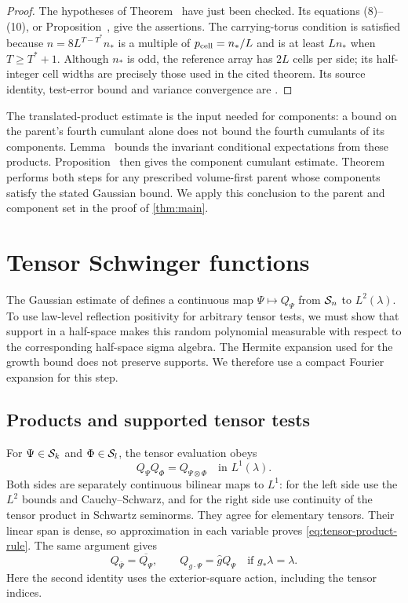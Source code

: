 \begin{proof}
The hypotheses of Theorem~
have just been checked. Its equations (8)--(10), or
Proposition~, give the assertions.
The carrying-torus condition is satisfied because
$n=8L^{T-T^*}n_*$ is a multiple of $p_{\rm cell}=n_*/L$
and is at least $Ln_*$ when $T\ge T^*+1$.
Although $n_*$ is odd, the reference array has $2L$ cells
per side; its half-integer cell widths are precisely those
used in the cited theorem. Its source identity, test-error
bound and variance convergence are \cite[Section~2.2, (19)--(20)]{VolumeTransfer}.
\end{proof}

The translated-product estimate is the input needed for
components: a bound on the parent's fourth cumulant alone
does not bound the fourth cumulants of its components.
Lemma~ bounds the invariant
conditional expectations from these products.
Proposition~ then gives the
component cumulant estimate. Theorem~
performs both steps for any prescribed volume-first parent
whose components satisfy the stated Gaussian bound.
We apply this conclusion to the parent and component set
in the proof of \cref{thm:main}.
\section{Tensor Schwinger functions}\label{sec:tensor-axioms}

The Gaussian estimate of \cite[Proposition~6.1]{ContinuumLimits} defines a continuous map
$\Psi\mapsto Q_\Psi$ from $\mathcal S_n$ to $L^2(\lambda)$.
To use law-level reflection positivity for arbitrary tensor tests,
we must show that support in a half-space makes this random polynomial
measurable with respect to the corresponding half-space sigma algebra. The Hermite
expansion used for the growth bound does not preserve supports.
We therefore use a compact Fourier expansion for this step.

\subsection{Products and supported tensor tests}

For $\Psi\in\mathcal S_k$ and $\Phi\in\mathcal S_l$, the tensor evaluation
obeys
\begin{equation}\label{eq:tensor-product-rule}
 Q_\Psi Q_\Phi=Q_{\Psi\otimes\Phi}\quad\text{in }L^1(\lambda).
\end{equation}
Both sides are separately continuous bilinear maps to $L^1$:
for the left side use the $L^2$ bounds and Cauchy--Schwarz, and for
the right side use continuity of the tensor product in Schwartz
seminorms. They agree for elementary tensors. Their linear span
is dense, so approximation in each variable proves
\eqref{eq:tensor-product-rule}. The same argument gives
\begin{equation}\label{eq:tensor-equivariance}
 Q_{\overline\Psi}=\overline{Q_\Psi},\qquad
 Q_{g\cdot\Psi}=\widehat g Q_\Psi
 \quad\text{if }g_*\lambda=\lambda.
\end{equation}
Here the second identity uses the exterior-square action, including
the tensor indices.

